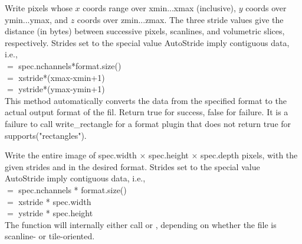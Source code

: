 \apiend


Write pixels whose $x$ coords range over {\kw xmin}...{\kw xmax}
(inclusive), $y$ coords over {\kw ymin}...{\kw ymax}, and $z$ coords
over {\kw zmin}...{\kw zmax}.  The three stride values give the distance
(in bytes) between successive pixels, scanlines, and volumetric slices,
respectively.  Strides set to the special value {\kw AutoStride} imply
contiguous data, i.e.,\\
 $=$ {\kw spec.nchannels*format.size()} \\
 $=$ {\kw xstride*(xmax-xmin+1)} \\
 $=$ {\kw ystride*(ymax-ymin+1)}\\
This method automatically converts the data from the specified 
{\kw format} to the actual output format of the fil.  Return {\kw true}
for success, {\kw false} for failure.  It is a failure to call 
{\kw write_rectangle} for a format plugin that does not return true for
{\kw supports("rectangles")}.

\apiend


Write the entire image of {\kw spec.width} $\times$ {\kw spec.height}
$\times$ {\kw spec.depth}
pixels, with the given strides and in the desired format.
Strides set to the special value {\kw AutoStride} imply contiguous data,
i.e., \\
 $=$ {\kw spec.nchannels * format.size()} \\
 $=$ {\kw xstride * spec.width} \\
 $=$ {\kw ystride * spec.height}\\
The function will internally either call \writescanline or 
\writetile, depending on whether the file is scanline- or
tile-oriented.

